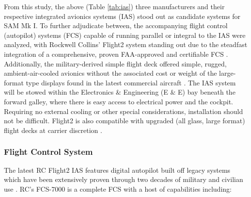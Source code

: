 From this study, the above (Table \ref{tab:ias}) three manufacturers and their respective integrated avionics systems (IAS) stood out as candidate systems for SAM Mk I.  To further adjudicate between, the accompanying flight control (autopilot) systems (FCS) capable of running parallel or integral to the IAS were analyzed, with Rockwell Collins' Flight2 system standing out due to the steadfast integration of a comprehensive, proven FAA-approved and certifiable FCS \cite{fcs7000pdf}.  Additionally, the military-derived simple flight deck \cite{flight2page} offered simple, rugged, ambient-air-cooled avionics \cite{flight2pdf} without the associated cost or weight of the large-format type displays found in the latest commercial aircraft \cite{flight2page}.  The IAS system will be stowed within the Electronics $\&$ Engineering (E $\&$ E) bay beneath the forward galley, where there is easy access to electrical power and the cockpit.  Requiring no external cooling or other special considerations, installation should not be difficult.  Flight2 is also compatible with upgraded (all glass, large format) flight decks at carrier discretion \cite{flight2page}. 


\subsubsection{Flight Control System}
The latest RC Flight2 IAS features digital autopilot built off legacy systems which have been extensively proven through two decades of military and civilian use \cite{flight2page}.  RC's FCS-7000 is a complete FCS with a host of capabilities \cite{fcs7000pdf} including:

